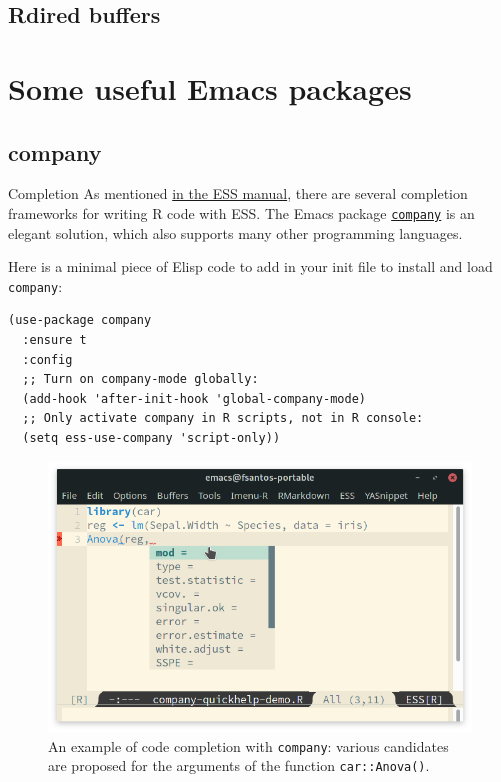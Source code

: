 \documentclass[presentation]{beamer}
\begin{document}
\subsection{Rdired buffers}
\label{sec:org8db9f00}

\section{Some useful Emacs packages}
\label{sec:org26a075d}
\subsection{company}
\label{sec:orgd1173c7}
\begin{frame}[fragile,allowframebreaks,label=]{Completion}
 As mentioned \href{https://ess.r-project.org/Manual/ess.html\#Completion}{in the ESS manual}, there are several completion frameworks for writing R code with ESS. The Emacs package \href{https://company-mode.github.io/}{\texttt{company}} is an elegant solution, which also supports many other programming languages.

Here is a minimal piece of Elisp code to add in your init file to install and load \texttt{company}:

\begin{verbatim}
(use-package company
  :ensure t
  :config
  ;; Turn on company-mode globally:
  (add-hook 'after-init-hook 'global-company-mode)
  ;; Only activate company in R scripts, not in R console:
  (setq ess-use-company 'script-only))
\end{verbatim}

\begin{figure}[htbp]
\centering
\includegraphics[width=0.72 \textwidth]{./images/company.png}
\caption{\label{fig:org1b742a5}An example of code completion with \texttt{company}: various candidates are proposed for the arguments of the function \texttt{car::Anova()}.}
\end{figure}


\end{frame}
\end{document}
